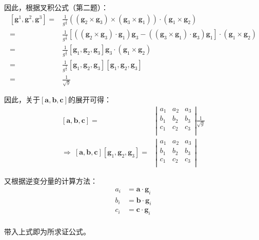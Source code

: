 \documentclass[UTF8,zihao=5]{ctexart}
\begin{document}
因此，根据叉积公式（第二题）：
\begin{equation*}
    \begin{aligned}
        [\bm{g}^1, \bm{g}^2, \bm{g}^3]=&
        \frac{1}{g^{\frac{3}{2}}}
        \left(
            (\bm{g}_2\times\bm{g}_3)\times
            (\bm{g}_3\times\bm{g}_1)
        \right)\cdot
        (\bm{g}_1\times\bm{g}_2)\\
        =&
        \frac{1}{g^{\frac{3}{2}}}
        \left[
            \left(
                (\bm{g}_2\times\bm{g}_3)\cdot\bm{g}_1
            \right)\bm{g}_3-
            \left(
                (\bm{g}_3\times\bm{g}_1)\cdot\bm{g}_3
            \right)\bm{g}_1
        \right]\cdot
        (\bm{g}_1\times\bm{g}_2)\\
        =&
        \frac{1}{g^{\frac{3}{2}}}
            [\bm{g}_1,\bm{g}_2,\bm{g}_3]\bm{g}_3\cdot
        (\bm{g}_1\times\bm{g}_2)\\
        =&
        \frac{1}{g^{\frac{3}{2}}}
            [\bm{g}_1,\bm{g}_2,\bm{g}_3][\bm{g}_1,\bm{g}_2,\bm{g}_3]\\
        =&
        \frac{1}{\sqrt{g}}
    \end{aligned}
\end{equation*}

因此，关于$[\bm{a},\bm{b},\bm{c}]$的展开可得：
\begin{equation*}
    \begin{aligned}
        [\bm{a},\bm{b},\bm{c}]
        =&\left|
            \begin{matrix}
                a_1 &a_2 &a_3\\
                b_1 &b_2 &b_3\\
                c_1 &c_2 &c_3\\
            \end{matrix}
        \right|\frac{1}{\sqrt{g}}\\
        \Rightarrow\ 
        [\bm{a},\bm{b},\bm{c}][\bm{g}_1,\bm{g}_2,\bm{g}_3]
        =&\left|
            \begin{matrix}
                a_1 &a_2 &a_3\\
                b_1 &b_2 &b_3\\
                c_1 &c_2 &c_3\\
            \end{matrix}
        \right|
    \end{aligned}
\end{equation*}

又根据逆变分量的计算方法：
\begin{equation*}
    \begin{aligned}
        a_i&=\bm{a}\cdot\bm{g}_i\\
        b_i&=\bm{b}\cdot\bm{g}_i\\
        c_i&=\bm{c}\cdot\bm{g}_i\\
    \end{aligned}
\end{equation*}

带入上式即为所求证公式。
\end{document}
